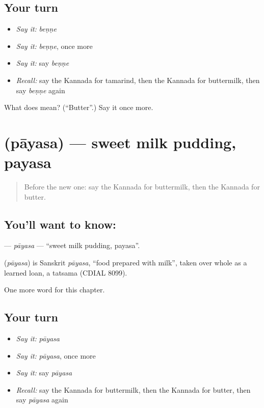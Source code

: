 \subsection*{Your turn}
\begin{itemize}
\raggedright
  \item \emph{Say it:} \emph{beṇṇe}
  \item \emph{Say it:} \emph{beṇṇe}, once more
  \item \emph{Say it:} say \emph{beṇṇe}
  \item \emph{Recall:} say the Kannada for tamarind, then the Kannada for buttermilk, then say \emph{beṇṇe} again
\end{itemize}

\begin{tcolorbox}[breakable,colback=teal!4,colframe=teal!35!black,title={Before you move on}]
What does  mean? (\textquotedblleft{}Butter\textquotedblright{}.) Say it once more.
\end{tcolorbox}
\section[\texorpdfstring{\kn{ಪಾಯಸ} (pāyasa)}{ಪಾಯಸ (pāyasa)}]{ (pāyasa) — sweet milk pudding, payasa}

\label{lesson:KA-C258-payasa}



\begin{quote}
Before the new one: say the Kannada for buttermilk, then the Kannada for butter.
\end{quote}

\subsection*{You'll want to know: }
\textbf{} — \emph{pāyasa} — \textquotedblleft{}sweet milk pudding, payasa\textquotedblright{}.

\begin{cousinweb}
\textbf{} (\emph{pāyasa}) is Sanskrit \emph{pāyasa}, \textquotedblleft{}food prepared with milk\textquotedblright{}, taken over whole as a learned loan, a tatsama (CDIAL 8099).
\end{cousinweb}

\begin{grammarlens}[title={What you've built}]
One more word for this chapter.
\end{grammarlens}

\subsection*{Your turn}
\begin{itemize}
\raggedright
  \item \emph{Say it:} \emph{pāyasa}
  \item \emph{Say it:} \emph{pāyasa}, once more
  \item \emph{Say it:} say \emph{pāyasa}
  \item \emph{Recall:} say the Kannada for buttermilk, then the Kannada for butter, then say \emph{pāyasa} again
\end{itemize}

